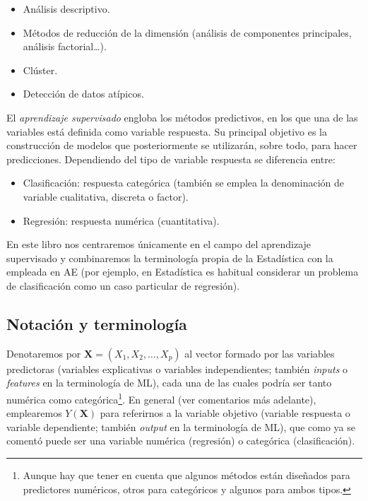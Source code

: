 \documentclass[
]{book}
\theoremstyle{break}
\theoremstyle{definition}
\theoremstyle{definition}
\theoremstyle{definition}
\theoremstyle{definition}
\theoremstyle{remark}
\begin{document}
\begin{itemize}
\item
  Análisis descriptivo.
\item
  Métodos de reducción de la dimensión (análisis de componentes principales, análisis factorial\ldots).
\item
  Clúster.
\item
  Detección de datos atípicos.
\end{itemize}

El \emph{aprendizaje supervisado} engloba los métodos predictivos, en los que una de las variables está definida como variable respuesta. Su principal objetivo es la construcción de modelos que posteriormente se utilizarán, sobre todo, para hacer predicciones. Dependiendo del tipo de variable respuesta se diferencia entre:

\begin{itemize}
\item
  Clasificación: respuesta categórica (también se emplea la denominación de variable cualitativa, discreta o factor).
\item
  Regresión: respuesta numérica (cuantitativa).
\end{itemize}

En este libro nos centraremos únicamente en el campo del aprendizaje supervisado y combinaremos la terminología propia de la Estadística con la empleada en AE (por ejemplo, en Estadística es habitual considerar un problema de clasificación como un caso particular de regresión).

\hypertarget{notacion}{%
\subsection{Notación y terminología}\label{notacion}}

Denotaremos por \(\mathbf{X}=(X_1, X_2, \ldots, X_p)\) al vector formado por las variables predictoras
(variables explicativas o variables independientes; también \emph{inputs} o \emph{features} en la terminología de ML), cada una de las cuales podría ser tanto numérica como categórica\footnote{Aunque hay que tener en cuenta que algunos métodos están diseñados para predictores numéricos, otros para categóricos y algunos para ambos tipos.}.
En general (ver comentarios más adelante), emplearemos \(Y\left(\mathbf{X} \right)\) para referirnos a la variable objetivo (variable respuesta o variable dependiente; también \emph{output} en la terminología de ML), que como ya se comentó puede ser una variable numérica (regresión) o categórica (clasificación).
\end{document}
